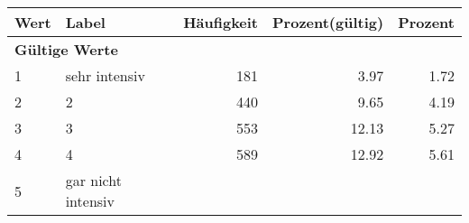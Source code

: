     \begin{longtable}{lXrrr}
     \toprule
     \textbf{Wert} & \textbf{Label} & \textbf{Häufigkeit} & \textbf{Prozent(gültig)} & \textbf{Prozent} \\
     \endhead
     \midrule
     \multicolumn{5}{l}{\textbf{Gültige Werte}}\\

     1 &
     \multicolumn{1}{X}{ sehr intensiv   } &


       \num{181} &
       \num[round-mode=places,round-precision=2]{3.97} &
         \num[round-mode=places,round-precision=2]{1.72} \\

     2 &
     \multicolumn{1}{X}{ 2   } &


       \num{440} &
       \num[round-mode=places,round-precision=2]{9.65} &
         \num[round-mode=places,round-precision=2]{4.19} \\

     3 &
     \multicolumn{1}{X}{ 3   } &


       \num{553} &
       \num[round-mode=places,round-precision=2]{12.13} &
         \num[round-mode=places,round-precision=2]{5.27} \\

     4 &
     \multicolumn{1}{X}{ 4   } &


       \num{589} &
       \num[round-mode=places,round-precision=2]{12.92} &
         \num[round-mode=places,round-precision=2]{5.61} \\

     5 &
     \multicolumn{1}{X}{ gar nicht intensiv   } &



\end{longtable}
